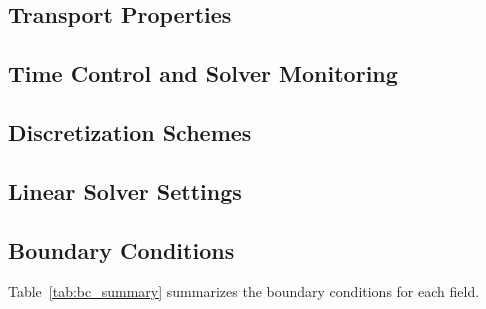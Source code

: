 \documentclass[12pt]{article}
\begin{document}
\subsection{Transport Properties}



\subsection{Time Control and Solver Monitoring}



\subsection{Discretization Schemes}



\subsection{Linear Solver Settings}



\subsection{Boundary Conditions}

Table~\ref{tab:bc_summary} summarizes the boundary conditions for each field.
\end{document}
